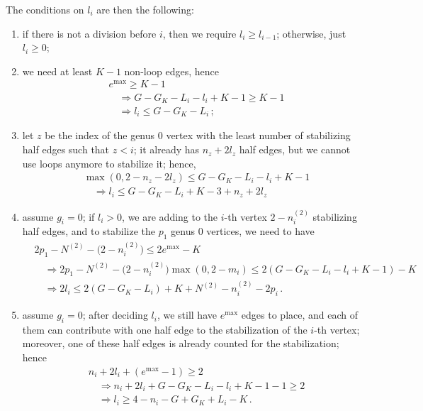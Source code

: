 \documentclass{amsart}
\theoremstyle{plain}
\theoremstyle{definition}
\DeclareMathOperator{\MAX}{max}
\begin{document}
The conditions on $l_i$ are then the following:
\begin{enumerate}
\item if there is not a division before $i$, then we require $l_i \geq
  l_{i-1}$; otherwise, just $l_i \geq 0$;
\item we need at least $K-1$ non-loop edges, hence
  \begin{align*}
    &e^{\MAX} \geq K-1\\
    &\quad\Rightarrow G - G_K - L_i - l_i + K-1 \geq K-1\\
    &\quad\Rightarrow l_i \leq G - G_K - L_i\,\text{;}
  \end{align*}
\item let $z$ be the index of the genus $0$ vertex with the least
  number of stabilizing half edges such that $z < i$; it already has
  $n_z + 2l_z$ half edges, but we cannot use loops anymore to
  stabilize it; hence,
  \begin{align*}
    &\max(0, 2-n_z-2l_z) \leq G - G_K - L_i - l_i + K - 1\\
    &\quad\Rightarrow l_i \leq G - G_K - L_i + K - 3 + n_z + 2l_z
  \end{align*}
\item assume $g_i = 0$; if $l_i > 0$, we are adding to the $i$-th
  vertex $2-n^{(2)}_i$ stabilizing half edges, and to stabilize the
  $p_1$ genus $0$ vertices, we need to have
  \begin{align*}
    &2 p_1 - N^{(2)} - \bigl(2-n^{(2)}_i\bigr) \leq 2e^{\MAX} - K\\
    &\quad\Rightarrow 2p_1 - N^{(2)} - \bigl(2-n^{(2)}_i\bigr) \max(0, 2-m_i) \leq 2(G - G_K - L_i - l_i + K - 1) - K\\
    &\quad\Rightarrow 2l_i \leq 2(G - G_K - L_i) + K + N^{(2)} - n^{(2)}_i - 2p_i\,\text{.}
  \end{align*}
\item assume $g_i = 0$; after deciding $l_i$, we still have $e^{\MAX}$
  edges to place, and each of them can contribute with one half edge
  to the stabilization of the $i$-th vertex; moreover, one of these
  half edges is already counted for the stabilization; hence
  \begin{align*}
    &n_i + 2l_i + (e^{\MAX} - 1) \geq 2\\
    &\quad\Rightarrow n_i + 2l_i + G - G_K - L_i - l_i + K - 1 - 1 \geq 2\\
    &\quad\Rightarrow l_i \geq 4 - n_i - G + G_K + L_i - K\,\text{.}
  \end{align*}
\end{enumerate}
\end{document}
